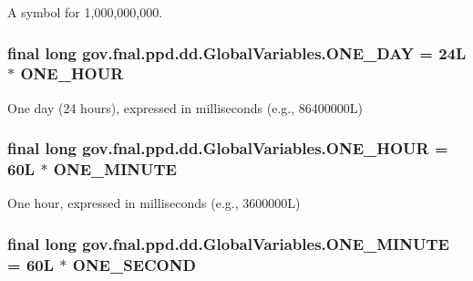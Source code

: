 A symbol for 1,000,000,000. \hypertarget{classgov_1_1fnal_1_1ppd_1_1dd_1_1GlobalVariables_aef5cbdf53c9830ae609987b805a08998}{
\subsubsection[{O\-N\-E\-\_\-\-D\-A\-Y}]{\setlength{\rightskip}{0pt plus 5cm}final long gov.\-fnal.\-ppd.\-dd.\-Global\-Variables.\-O\-N\-E\-\_\-\-D\-A\-Y = 24\-L $\ast$ O\-N\-E\-\_\-\-H\-O\-U\-R\hspace{0.3cm}{\ttfamily [static]}}}\label{classgov_1_1fnal_1_1ppd_1_1dd_1_1GlobalVariables_aef5cbdf53c9830ae609987b805a08998}
One day (24 hours), expressed in milliseconds (e.\-g., 86400000\-L) \hypertarget{classgov_1_1fnal_1_1ppd_1_1dd_1_1GlobalVariables_a947f75994e24bb52604adf3699920579}{
\subsubsection[{O\-N\-E\-\_\-\-H\-O\-U\-R}]{\setlength{\rightskip}{0pt plus 5cm}final long gov.\-fnal.\-ppd.\-dd.\-Global\-Variables.\-O\-N\-E\-\_\-\-H\-O\-U\-R = 60\-L $\ast$ O\-N\-E\-\_\-\-M\-I\-N\-U\-T\-E\hspace{0.3cm}{\ttfamily [static]}}}\label{classgov_1_1fnal_1_1ppd_1_1dd_1_1GlobalVariables_a947f75994e24bb52604adf3699920579}
One hour, expressed in milliseconds (e.\-g., 3600000\-L) \hypertarget{classgov_1_1fnal_1_1ppd_1_1dd_1_1GlobalVariables_a79fc1e35198b44168537a85aa4c2d942}{
\subsubsection[{O\-N\-E\-\_\-\-M\-I\-N\-U\-T\-E}]{\setlength{\rightskip}{0pt plus 5cm}final long gov.\-fnal.\-ppd.\-dd.\-Global\-Variables.\-O\-N\-E\-\_\-\-M\-I\-N\-U\-T\-E = 60\-L $\ast$ O\-N\-E\-\_\-\-S\-E\-C\-O\-N\-D\hspace{0.3cm}{\ttfamily [static]}}}\label{classgov_1_1fnal_1_1ppd_1_1dd_1_1GlobalVariables_a79fc1e35198b44168537a85aa4c2d942}

